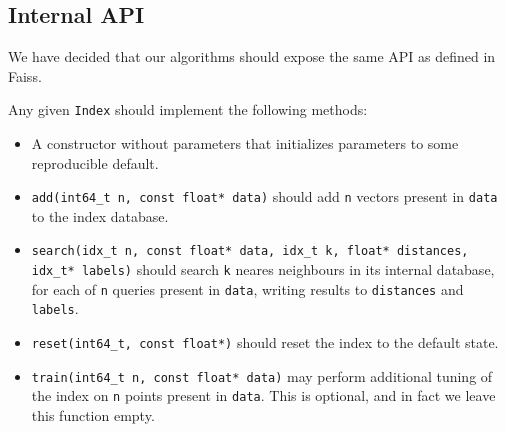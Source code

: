 \subsection{Internal API}

We have decided that our algorithms should expose the same API as defined in Faiss.

Any given \texttt{Index} should implement the following methods:
\begin{itemize}

\item A constructor without parameters that initializes parameters to some reproducible default.

\item \texttt{add(int64\_t n, const float* data)} 
should add \texttt{n} vectors present in \texttt{data} to the index database.

\item \texttt{search(idx\_t n, const float* data, idx\_t k, float* distances, idx\_t* labels)} 
should search \texttt{k} neares neighbours 
in its internal database, for each of \texttt{n} queries present in \texttt{data}, writing results to \texttt{distances} and \texttt{labels}.

\item \texttt{reset(int64\_t, const float*)} 
should reset the index to the default state.

\item \texttt{train(int64\_t n, const float* data)} 
may perform additional tuning of the index on \texttt{n} points present in \texttt{data}. This is
optional, and in fact we leave this function empty.

\end{itemize}
